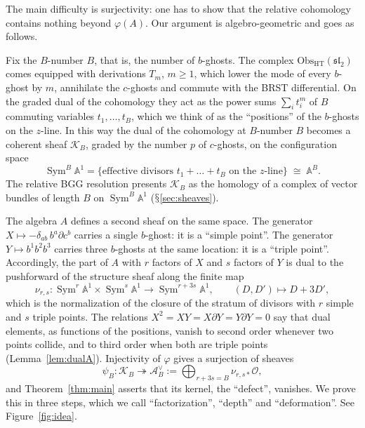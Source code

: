 \documentclass[11pt]{amsart}
\numberwithin{equation}{section}
\renewcommand{\S}{\mbox{$\mathsection$}}
\theoremstyle{definition}
\theoremstyle{remark}
\newcommand{\A}{\mathbb{A}}
\newcommand{\dd}{\partial}
\newcommand{\cO}{\mathcal{O}}
\newcommand{\cK}{\mathcal{K}}
\newcommand{\cA}{\mathcal{A}}
\newcommand{\Sym}{\operatorname{Sym}}
\begin{document}
The main difficulty is surjectivity: one has to show that the relative cohomology contains nothing beyond $\varphi(A)$. Our argument is algebro-geometric and goes as follows.

Fix the $B$-number $B$, that is, the number of $b$-ghosts. The complex $\text{Obs}_{\text{HT}}(\mathfrak{sl}_2)$ comes equipped with derivations $T_m$, $m\ge1$, which lower the mode of every $b$-ghost by $m$, annihilate the $c$-ghosts and commute with the BRST differential. On the graded dual of the cohomology they act as the power sums $\sum_it_i^m$ of $B$ commuting variables $t_1,\dots,t_B$, which we think of as the ``positions'' of the $b$-ghosts on the $z$-line. In this way the dual of the cohomology at $B$-number $B$ becomes a coherent sheaf $\cK_B$, graded by the number $p$ of $c$-ghosts, on the configuration space
\begin{equation}\label{eq:intro-symB}
\Sym^B\A^1=\{\text{effective divisors } t_1+\dots+t_B \text{ on the } z\text{-line}\}\;\cong\;\A^B .
\end{equation}
The relative BGG resolution presents $\cK_B$ as the homology of a complex of vector bundles of length $B$ on $\Sym^B\A^1$ (\S\ref{sec:sheaves}).

The algebra $A$ defines a second sheaf on the same space. The generator $X\mapsto-\delta_{ab}\,b^a\dd c^b$ carries a single $b$-ghost: it is a ``simple point''. The generator $Y\mapsto b^1b^2b^3$ carries three $b$-ghosts at the same location: it is a ``triple point''. Accordingly, the part of $A$ with $r$ factors of $X$ and $s$ factors of $Y$ is dual to the pushforward of the structure sheaf along the finite map
\begin{equation}\label{eq:intro-nu}
\nu_{r,s}:\Sym^r\A^1\times\Sym^s\A^1\longrightarrow\Sym^{r+3s}\A^1,\qquad (D,D')\longmapsto D+3D',
\end{equation}
which is the normalization of the closure of the stratum of divisors with $r$ simple and $s$ triple points. The relations $X^2=XY=X\dd Y=Y\dd Y=0$ say that dual elements, as functions of the positions, vanish to second order whenever two points collide, and to third order when both are triple points (Lemma~\ref{lem:dualA}). Injectivity of $\varphi$ gives a surjection of sheaves
\begin{equation}\label{eq:intro-psi}
\psi_B:\cK_B\twoheadrightarrow\cA^\vee_B:=\bigoplus_{r+3s=B}\nu_{r,s*}\cO,
\end{equation}
and Theorem~\ref{thm:main} asserts that its kernel, the ``defect'', vanishes. We prove this in three steps, which we call ``factorization'', ``depth'' and ``deformation''. See Figure~\ref{fig:idea}.
\end{document}
